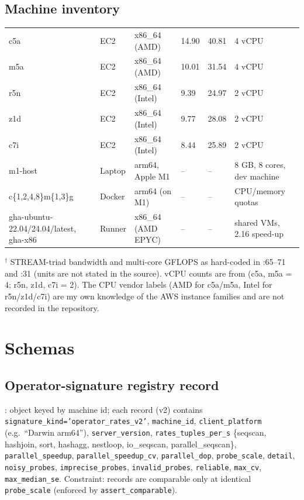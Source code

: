 \subsection{Machine inventory}
\begin{center}\small
\begin{tabularx}{\textwidth}{@{}L{2.2cm}L{1.4cm}L{2.6cm}L{2.0cm}L{2.2cm}Y@{}}
\toprule {} &  &  &  &  & \\ \midrule
c5a & EC2 & x86\_64 (AMD) & 14.90 & 40.81 & 4 vCPU\\
m5a & EC2 & x86\_64 (AMD) & 10.01 & 31.54 & 4 vCPU\\
r5n & EC2 & x86\_64 (Intel) & 9.39 & 24.97 & 2 vCPU\\
z1d & EC2 & x86\_64 (Intel) & 9.77 & 28.08 & 2 vCPU\\
c7i & EC2 & x86\_64 (Intel) & 8.44 & 25.89 & 2 vCPU\\
m1-host & Laptop & arm64, Apple M1 & -- & -- & 8 GB, 8 cores, dev machine\\
c\{1,2,4,8\}m\{1,3\}g & Docker & arm64 (on M1) & -- & -- & CPU/memory quotas\\
gha-ubuntu-22.04/24.04/latest, gha-x86 & Runner & x86\_64 (AMD EPYC) & -- & -- & shared VMs, 2.16 speed-up\\
\bottomrule
\end{tabularx}
\end{center}
{\footnotesize $^\dagger$ STREAM-triad bandwidth and multi-core GFLOPS as hard-coded in :65--71 and :31 (units are not stated in the source). vCPU counts are from  (c5a, m5a = 4; r5n, z1d, c7i = 2). The CPU vendor labels (AMD for c5a/m5a, Intel for r5n/z1d/c7i) are my own knowledge of the AWS instance families and are not recorded in the repository.}

\section{Schemas}
\subsection{Operator-signature registry record}
: object keyed by machine id; each record (v2) contains
\texttt{signature\_kind='operator\_rates\_v2'}, \texttt{machine\_id}, \texttt{client\_platform} (e.g.\ ``Darwin arm64''),
\texttt{server\_version}, \texttt{rates\_tuples\_per\_s} \{seqscan, hashjoin, sort, hashagg, nestloop, io\_seqscan, parallel\_seqscan\},
\texttt{parallel\_speedup}, \texttt{parallel\_speedup\_cv}, \texttt{parallel\_dop}, \texttt{probe\_scale}, \texttt{detail},
\texttt{noisy\_probes}, \texttt{imprecise\_probes}, \texttt{invalid\_probes}, \texttt{reliable}, \texttt{max\_cv}, \texttt{max\_median\_se}.
Constraint: records are comparable only at identical \texttt{probe\_scale} (enforced by \texttt{assert\_comparable}).

